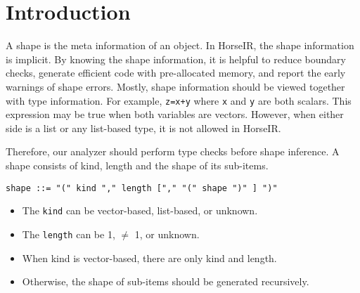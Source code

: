 \section{Introduction}

A shape is the meta information of an object.  In HorseIR, the shape information is implicit.  By knowing the shape information, it is helpful to reduce boundary checks, generate efficient code with pre-allocated memory, and report the early warnings of shape errors.  Mostly, shape information should be viewed together with type information.  For example, \texttt{z=x+y} where \texttt{x} and \texttt{y} are both scalars.  This expression may be true when both variables are vectors.  However, when either side is a list or any list-based type, it is not allowed in HorseIR.

Therefore, our analyzer should perform type checks before shape inference.
A shape consists of kind, length and the shape of its sub-items.

\begin{verbatim}
shape ::= "(" kind "," length ["," "(" shape ")" ] ")"
\end{verbatim}


\begin{itemize}[noitemsep]
\item The \texttt{kind} can be vector-based, list-based, or unknown.
\item The \texttt{length} can be 1, $\neq$ 1, or unknown.
\item When kind is vector-based, there are only kind and length.
\item Otherwise, the shape of sub-items should be generated recursively.
\end{itemize}

%

%
  
